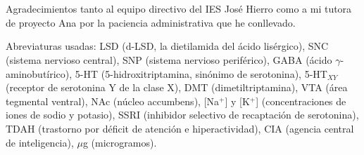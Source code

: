 \section*{}
\thispagestyle{empty}

Agradecimientos tanto al equipo directivo del IES José Hierro como a mi tutora de proyecto Ana por la paciencia administrativa que he conllevado.

Abreviaturas usadas: LSD (d-LSD, la dietilamida del ácido lisérgico), SNC (sistema nervioso central), SNP (sistema nervioso periférico), GABA (ácido $\gamma$-aminobutírico), 5-HT (5-hidroxitriptamina, sinónimo de serotonina), 5-HT$_{XY}$ (receptor de serotonina Y de la clase X), DMT (dimetiltriptamina), VTA (área tegmental ventral), NAc (núcleo accumbens), [Na$^+$] y [K$^+$] (concentraciones de iones de sodio y potasio), SSRI (inhibidor selectivo de recaptación de serotonina), TDAH (trastorno por déficit de atención e hiperactividad), CIA (agencia central de inteligencia), $\mu$g (microgramos).

\clearpage
